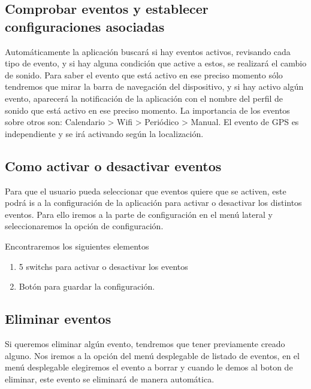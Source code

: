 
\subsection{Comprobar eventos y establecer configuraciones asociadas}

Automáticamente la aplicación buscará si hay eventos activos, revisando cada tipo de evento, y si hay alguna condición que active a estos, se realizará el cambio de sonido. Para saber el evento que está activo en ese preciso momento sólo tendremos que mirar la barra de navegación del dispositivo, y si hay activo algún evento, aparecerá la notificación de la aplicación con el nombre del perfil de sonido que está activo en ese preciso momento. La importancia de los eventos sobre otros son: Calendario > Wifi > Periódico > Manual. El evento de GPS es independiente y se irá activando según la localización.


\subsection{Como activar o desactivar eventos}
Para que el usuario pueda seleccionar que eventos quiere que se activen, este podrá is a la configuración de la aplicación para activar o desactivar los distintos eventos.
Para ello iremos a la parte de configuración en el menú lateral y seleccionaremos la opción de configuración.

Encontraremos los siguientes elementos
\begin{enumerate}
\item 5 switchs para activar o desactivar los eventos
\item Botón para guardar la configuración.
\end{enumerate}


\subsection{Eliminar eventos}
Si queremos eliminar algún evento, tendremos que tener previamente creado alguno. Nos iremos a la opción del menú desplegable de listado de eventos, en el menú desplegable elegiremos el evento a borrar y cuando le demos al boton de eliminar, este evento se eliminará de manera automática.

